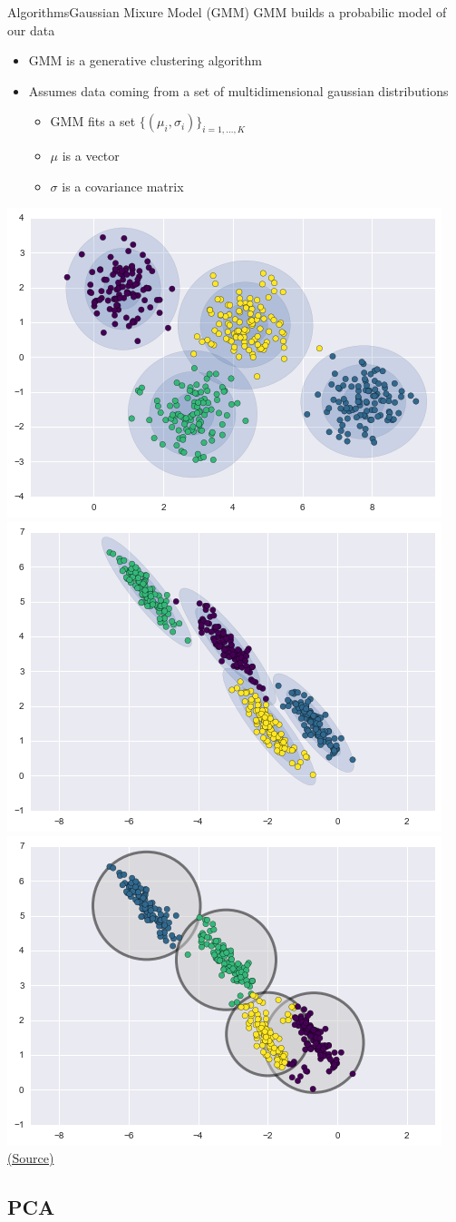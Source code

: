 \documentclass[10pt,compress]{beamer} %
\begin{document}
\begin{frame}{Algorithms}{Gaussian Mixure Model (GMM)}
	GMM builds a probabilic model of our data
	\begin{itemize}
		\item GMM is a generative clustering algorithm
		\item Assumes data coming from a set of multidimensional gaussian distributions
			\begin{itemize}
				\item GMM fits a set $\{(\mu_i, \sigma_i)\}_{i=1,\dots, K}$
				\item $\mu$ is a vector
				\item $\sigma$ is a covariance matrix
			\end{itemize}
	\end{itemize}

	\bigskip
	\centering \includegraphics[width=0.31\linewidth]{figs/gmm2.png}
	\includegraphics[width=0.31\linewidth]{figs/gmm3.png}
	\centering\includegraphics[width=0.31\linewidth]{figs/gmm1.png}\\
	\scriptsize\href{https://jakevdp.github.io/PythonDataScienceHandbook/05.12-gaussian-mixtures.html}{(Source)}
\end{frame}

\subsection{PCA}
\end{document}
